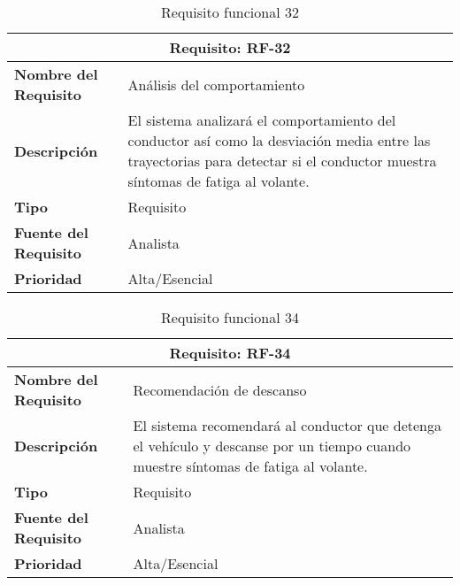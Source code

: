 \begin{table}[H]
\begin{center}
\begin{tabular}{p{} p{7cm}}
\multicolumn{2}{c}{\textbf{Requisito: RF-32} } \\
\hline \hline
\textbf{Nombre del Requisito} & Análisis del comportamiento\\
\hline
\textbf{Descripción} & El sistema analizará el comportamiento del conductor así como la desviación media entre las trayectorias para detectar si el conductor muestra síntomas de fatiga al volante.\\
\hline
\textbf{Tipo} & Requisito  \\
\hline
\textbf{Fuente del Requisito} & Analista  \\
\hline
\textbf{Prioridad} & Alta/Esencial  \\ \hline
\end{tabular}
\caption{Requisito funcional 32}
\label{tab:RF-32}
\end{center}
\end{table}

\begin{table}[H]
\begin{center}
\begin{tabular}{p{} p{7cm}}
\multicolumn{2}{c}{\textbf{Requisito: RF-34} } \\
\hline \hline
\textbf{Nombre del Requisito} & Recomendación de descanso\\
\hline
\textbf{Descripción} & El sistema recomendará al conductor que detenga el vehículo y descanse por un tiempo cuando muestre síntomas de fatiga al volante. \\
\hline
\textbf{Tipo} & Requisito  \\
\hline
\textbf{Fuente del Requisito} & Analista  \\
\hline
\textbf{Prioridad} & Alta/Esencial  \\ \hline
\end{tabular}
\caption{Requisito funcional 34}
\label{tab:RF-34}
\end{center}
\end{table}

